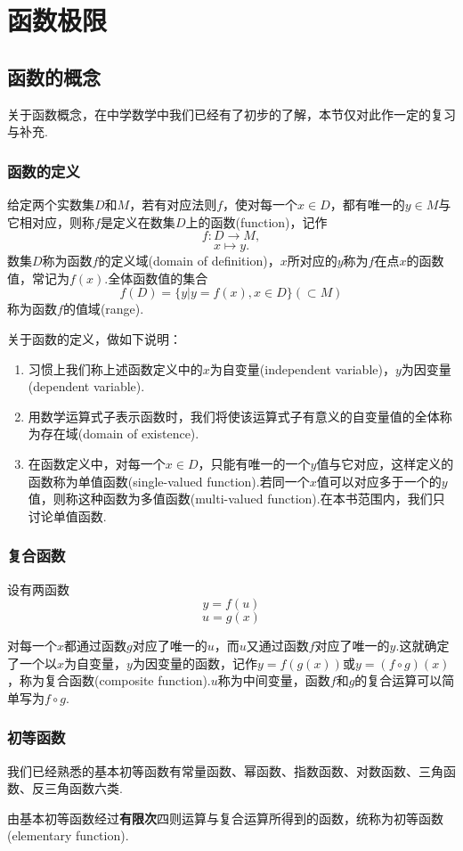 \chapter{函数极限}
\section{函数的概念}
关于函数概念，在中学数学中我们已经有了初步的了解，本节仅对此作一定的复习与补充.
\subsection{函数的定义}
\begin{definition}[函数]
	给定两个实数集$D$和$M$，若有对应法则$f$，使对每一个$x\in D$，都有唯一的$y\in M$与它相对应，则称$f$是定义在数集$D$上的{\heiti 函数}(function)，记作
	$$f:D\to M,$$
	$$x\mapsto y.$$
	数集$D$称为函数$f$的{\heiti 定义域}(domain of definition)，$x$所对应的$y$称为$f$在点$x$的函数值，常记为$f(x)$.全体函数值的集合
	$$f(D)=\{y|y=f(x),x\in D\}(\subset M)$$
	称为函数$f$的{\heiti 值域}(range).
\end{definition}
关于函数的定义，做如下说明：
\begin{enumerate}
	\item 习惯上我们称上述函数定义中的$x$为{\heiti 自变量}(independent variable)，$y$为{\heiti 因变量}(dependent variable).
	\item 用数学运算式子表示函数时，我们将使该运算式子有意义的自变量值的全体称为{\heiti 存在域}(domain of existence).
	\item 在函数定义中，对每一个$x\in D$，只能有唯一的一个$y$值与它对应，这样定义的函数称为{\heiti 单值函数}(single-valued function).若同一个$x$值可以对应多于一个的$y$值，则称这种函数为{\heiti 多值函数}(multi-valued function).在本书范围内，我们只讨论单值函数.
\end{enumerate}
\subsection{复合函数}
\begin{definition}[复合函数]
	
	设有两函数
	$$y=f(u)$$
	$$u=g(x)$$
	
	对每一个$x$都通过函数$g$对应了唯一的$u$，而$u$又通过函数$f$对应了唯一的$y$.这就确定了一个以$x$为自变量，$y$为因变量的函数，记作$y=f(g(x))$或$y=(f\circ g)(x)$，称为{\heiti 复合函数}(composite function).$u$称为中间变量，函数$f$和$g$的复合运算可以简单写为$f\circ g$.
\end{definition}
\subsection{初等函数}
我们已经熟悉的基本初等函数有常量函数、幂函数、指数函数、对数函数、三角函数、反三角函数六类.
\begin{definition}[初等函数]
	由基本初等函数经过\textbf{有限次}四则运算与复合运算所得到的函数，统称为{\heiti 初等函数}(elementary function).
\end{definition}
